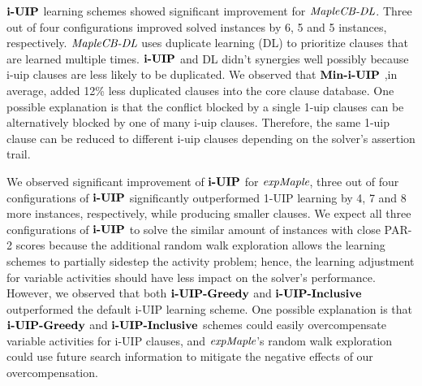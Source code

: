 $\textbf{i-UIP}$ learning schemes showed significant improvement for $\textit{MapleCB-DL}$. Three out of four configurations improved solved instances by 6, 5 and 5 instances, respectively. $\textit{MapleCB-DL}$ uses duplicate learning (DL) to prioritize clauses that are learned multiple times. $\textbf{i-UIP}$ and DL didn't synergies well possibly because i-uip clauses are less likely to be duplicated. We observed that $\textbf{Min-i-UIP}$ ,in average, added 12\% less duplicated clauses into the core clause database. One possible explanation is that the conflict blocked by a single 1-uip clauses can be alternatively blocked by one of many i-uip clauses. Therefore, the same 1-uip clause can be reduced to different i-uip clauses depending on the solver's assertion trail.

We observed significant improvement of $\textbf{i-UIP}$ for $\textit{expMaple}$, three out of four configurations of $\textbf{i-UIP}$ significantly outperformed 1-UIP learning by 4, 7 and 8 more instances, respectively, while producing smaller clauses. We expect all three configurations of $\textbf{i-UIP}$ to solve the similar amount of instances with close PAR-2 scores because the additional random walk exploration allows the learning schemes to partially sidestep the activity problem; hence, the learning adjustment for variable activities should have less impact on the solver's performance. However, we observed that both $\textbf{i-UIP-Greedy}$ and $\textbf{i-UIP-Inclusive}$ outperformed the default i-UIP learning scheme. One possible explanation is that $\textbf{i-UIP-Greedy}$ and $\textbf{i-UIP-Inclusive}$ schemes could easily overcompensate variable activities for i-UIP clauses, and $\textit{expMaple}$'s random walk exploration could use future search information to mitigate the negative effects of our overcompensation. 


